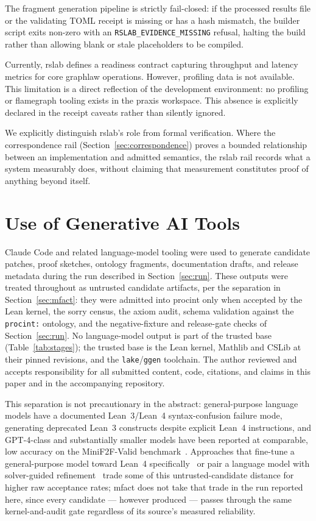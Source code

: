 \documentclass[11pt]{article}
\begin{document}
The fragment generation pipeline is strictly fail-closed: if the processed results file or the validating TOML receipt is missing or has a hash mismatch, the builder script exits non-zero with an \texttt{RSLAB\_EVIDENCE\_MISSING} refusal, halting the build rather than allowing blank or stale placeholders to be compiled.

Currently, \textsf{rslab} defines a readiness contract capturing throughput and latency metrics for core graphlaw operations. However, profiling data is not available. This limitation is a direct reflection of the development environment: no profiling or flamegraph tooling exists in the \textsf{praxis} workspace. This absence is explicitly declared in the receipt caveats rather than silently ignored.

We explicitly distinguish \textsf{rslab}'s role from formal verification. Where the correspondence rail (Section~\ref{sec:correspondence}) proves a bounded relationship between an implementation and admitted semantics, the \textsf{rslab} rail records what a system measurably does, without claiming that measurement constitutes proof of anything beyond itself.


\section{Use of Generative AI Tools}
\label{sec:ai-disclosure}

Claude Code and related language-model tooling were used to generate
candidate patches, proof sketches, ontology fragments, documentation
drafts, and release metadata during the run described in
Section~\ref{sec:run}. These outputs were treated throughout as untrusted
candidate artifacts, per the separation in Section~\ref{sec:mfact}: they
were admitted into \textsf{procint} only when accepted by the Lean kernel,
the sorry census, the axiom audit, schema validation against the
\texttt{procint:} ontology, and the negative-fixture and release-gate
checks of Section~\ref{sec:run}. No language-model output is part of the
trusted base (Table~\ref{tab:stages}); the trusted base is the Lean kernel,
Mathlib and CSLib at their pinned revisions, and the \texttt{lake}/\texttt{ggen}
toolchain. The author reviewed and accepts responsibility for all submitted
content, code, citations, and claims in this paper and in the accompanying
repository.

This separation is not precautionary in the abstract: general-purpose
language models have a documented Lean~3/Lean~4 syntax-confusion failure
mode, generating deprecated Lean~3 constructs despite explicit Lean~4
instructions, and GPT-4-class and substantially smaller models have been
reported at comparable, low accuracy on the MiniF2F-Valid
benchmark~\cite{langconfusion2025}. Approaches that fine-tune a
general-purpose model toward Lean~4 specifically~\cite{theoremllama2024} or
pair a language model with solver-guided refinement~\cite{apollo2025} trade
some of this untrusted-candidate distance for higher raw acceptance rates;
\textsf{mfact} does not take that trade in the run reported here, since every
candidate --- however produced --- passes through the same kernel-and-audit
gate regardless of its source's measured reliability.
\end{document}
